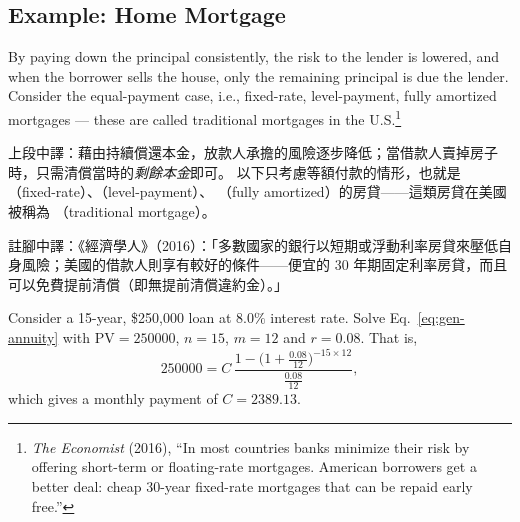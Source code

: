 \subsection{Example: Home Mortgage}


By paying down the principal consistently, the risk to the lender is lowered, and when the borrower sells the house, only the remaining principal is due the lender.
Consider the equal-payment case, i.e., fixed-rate, level-payment, fully amortized mortgages --- these are called traditional mortgages in the U.S.\footnote{\emph{The Economist} (2016), ``In most countries banks minimize their risk by offering short-term or floating-rate mortgages.
American borrowers get a better deal: cheap 30-year fixed-rate mortgages that can be repaid early free.''}

\begin{remark}
	上段中譯：藉由持續償還本金，放款人承擔的風險逐步降低；當借款人賣掉房子時，只需清償當時的\emph{剩餘本金}即可。
	以下只考慮等額付款的情形，也就是 （fixed-rate）、（level-payment）、 （fully amortized）的房貸——這類房貸在美國被稱為 （traditional mortgage）。

	註腳中譯：《經濟學人》（2016）：「多數國家的銀行以短期或浮動利率房貸來壓低自身風險；美國的借款人則享有較好的條件——便宜的 30 年期固定利率房貸，而且可以免費提前清償（即無提前清償違約金）。」
\end{remark}

\begin{eg}
	Consider a 15-year, \$250,000 loan at $8.0\%$ interest rate.
	Solve Eq.~\eqref{eq:gen-annuity} with $\mathrm{PV} = 250000$, $n = 15$, $m = 12$ and $r = 0.08$.
	That is,
	\[
		250000 = C\,\frac{1-\bigl(1+\frac{0.08}{12}\bigr)^{-15\times 12}}
		{\frac{0.08}{12}} ,
	\]
	which gives a monthly payment of $C = 2389.13$.
\end{eg}


